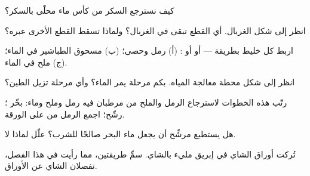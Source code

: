 \begin{exercise}[$\star$]\label{exo:g3:separating-mixtures:5}
كيف نسترجع السكر من كأس ماء محلّى بالسكر؟
\end{exercise}

\begin{exercise}[$\star$]\label{exo:g3:separating-mixtures:6}
انظر إلى شكل الغربال. أي القطع تبقى في الغربال؟ ولماذا تسقط القطع
الأخرى عبره؟
\end{exercise}

\begin{exercise}[$\star$]\label{exo:g3:separating-mixtures:7}
اربط كل خليط بطريقة ---  أو  أو :
(أ) رمل وحصى؛ (ب) مسحوق الطباشير في الماء؛ (ج) ملح في الماء.
\end{exercise}

\begin{exercise}[$\star$]\label{exo:g3:separating-mixtures:8}
انظر إلى شكل محطة معالجة المياه. بكم مرحلة يمر الماء؟ وأي مرحلة تزيل
الطين؟
\end{exercise}

\begin{exercise}[$\star$]\label{exo:g3:separating-mixtures:9}
رتّب هذه الخطوات لاسترجاع الرمل والملح من مرطبان فيه رمل وملح وماء:
بخّر ؛ رشّح؛ اجمع الرمل من على
الورقة.
\end{exercise}

\begin{exercise}[$\star\star$]\label{exo:g3:separating-mixtures:10}
هل يستطيع مرشِّح أن يجعل ماء البحر صالحًا للشرب؟ علّل لماذا لا.
\end{exercise}

\begin{exercise}[$\star\star$]\label{exo:g3:separating-mixtures:11}
تُركت أوراق الشاي في إبريق مليء بالشاي. سمِّ طريقتين، مما رأيت في هذا
الفصل، تفصلان الشاي عن الأوراق.
\end{exercise}
